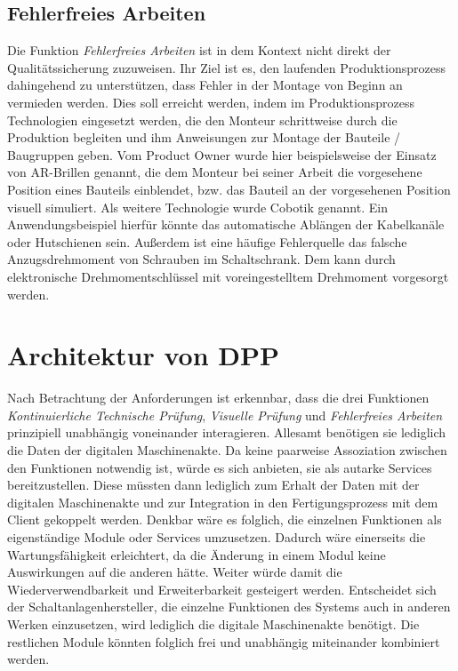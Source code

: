 \documentclass[
    type=Prakikumsbericht,
    status=draft, %
    language=german, %
    bibengine=bibtex,
]{unibwm-inf-thesis}
\begin{document}
    \subsection{Fehlerfreies Arbeiten}\label{subsec:fehlerfreies-arbeiten}
    Die Funktion \textit{Fehlerfreies Arbeiten} ist in dem Kontext nicht direkt der Qualitätssicherung zuzuweisen.
    Ihr Ziel ist es, den laufenden Produktionsprozess dahingehend zu unterstützen, dass Fehler in der Montage von
    Beginn an vermieden werden.
    Dies soll erreicht werden, indem im Produktionsprozess Technologien eingesetzt werden, die den Monteur schrittweise
    durch die Produktion begleiten und ihm Anweisungen zur Montage der Bauteile / Baugruppen geben.
    Vom Product Owner wurde hier beispielsweise der Einsatz von AR-Brillen genannt, die dem Monteur bei seiner Arbeit
    die vorgesehene Position eines Bauteils einblendet, bzw. das Bauteil an der vorgesehenen Position visuell simuliert.
    Als weitere Technologie wurde Cobotik genannt.
    Ein Anwendungsbeispiel hierfür könnte das automatische Ablängen der Kabelkanäle oder Hutschienen sein.
    Außerdem ist eine häufige Fehlerquelle das falsche Anzugsdrehmoment von Schrauben im Schaltschrank.
    Dem kann durch elektronische Drehmomentschlüssel mit voreingestelltem Drehmoment vorgesorgt werden.


    \section{Architektur von DPP}
    Nach Betrachtung der Anforderungen ist erkennbar, dass die drei Funktionen \textit{Kontinuierliche Technische
    Prüfung}, \textit{Visuelle Prüfung} und \textit{Fehlerfreies Arbeiten} prinzipiell unabhängig voneinander interagieren.
    Allesamt benötigen sie lediglich die Daten der digitalen Maschinenakte.
    Da keine paarweise Assoziation zwischen den Funktionen notwendig ist, würde es sich anbieten, sie als autarke Services
    bereitzustellen.
    Diese müssten dann lediglich zum Erhalt der Daten mit der digitalen Maschinenakte und zur Integration in den
    Fertigungsprozess mit dem Client gekoppelt werden.
    Denkbar wäre es folglich, die einzelnen Funktionen als eigenständige Module oder Services umzusetzen.
    Dadurch wäre einerseits die Wartungsfähigkeit erleichtert, da die Änderung in einem Modul keine Auswirkungen auf die anderen hätte.
    Weiter würde damit die Wiederverwendbarkeit und Erweiterbarkeit gesteigert werden.
    Entscheidet sich der Schaltanlagenhersteller, die einzelne Funktionen des Systems auch in anderen Werken einzusetzen, wird lediglich die digitale Maschinenakte benötigt.
    Die restlichen Module könnten folglich frei und unabhängig miteinander kombiniert werden.\\
\end{document}
